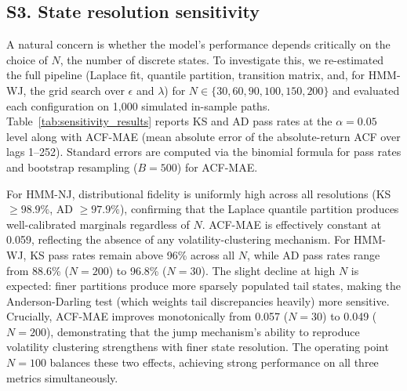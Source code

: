 \clearpage

\subsection*{S3. State resolution sensitivity}

A natural concern is whether the model's performance depends critically on the choice of $N$, the number of discrete states.
To investigate this, we re-estimated the full pipeline (Laplace fit, quantile partition, transition matrix, and, for HMM-WJ, the grid search over $\epsilon$ and $\lambda$) for $N \in \{30, 60, 90, 100, 150, 200\}$ and evaluated each configuration on 1{,}000 simulated in-sample paths.
Table~\ref{tab:sensitivity_results} reports KS and AD pass rates at the $\alpha = 0.05$ level along with ACF-MAE (mean absolute error of the absolute-return ACF over lags 1--252).
Standard errors are computed via the binomial formula for pass rates and bootstrap resampling ($B = 500$) for ACF-MAE.

For HMM-NJ, distributional fidelity is uniformly high across all resolutions (KS $\geq 98.9\%$, AD $\geq 97.9\%$), confirming that the Laplace quantile partition produces well-calibrated marginals regardless of $N$.
ACF-MAE is effectively constant at 0.059, reflecting the absence of any volatility-clustering mechanism.
For HMM-WJ, KS pass rates remain above 96\% across all $N$, while AD pass rates range from 88.6\% ($N = 200$) to 96.8\% ($N = 30$).
The slight decline at high $N$ is expected: finer partitions produce more sparsely populated tail states, making the Anderson-Darling test (which weights tail discrepancies heavily) more sensitive.
Crucially, ACF-MAE improves monotonically from 0.057 ($N = 30$) to 0.049 ($N = 200$), demonstrating that the jump mechanism's ability to reproduce volatility clustering strengthens with finer state resolution.
The operating point $N = 100$ balances these two effects, achieving strong performance on all three metrics simultaneously.

